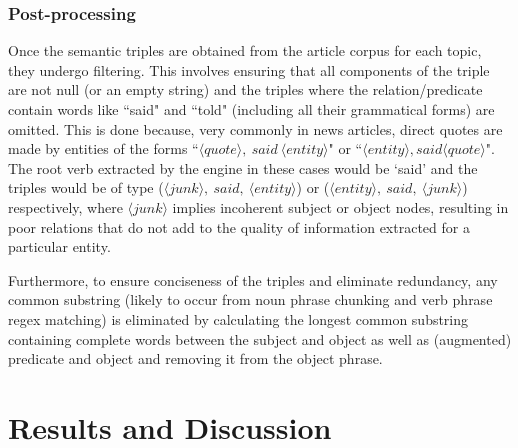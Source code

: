 \subsubsection{Post-processing}
Once the semantic triples are obtained from the article corpus for each topic, they undergo filtering. This involves ensuring that all components of the triple are not null (or an empty string) and the triples where the relation/predicate contain words like ``said" and ``told" (including all their grammatical forms) are omitted. This is done because, very commonly in news articles, direct quotes are made by entities of the forms ``$\langle quote \rangle, \ said \ \langle entity \rangle$" or ``$ \langle entity \rangle, said \big \langle quote \rangle$". The root verb extracted by the engine in these cases would be `said' and the triples would be of type ($\langle junk \rangle, \ said, \ \langle entity \rangle$) or ($\langle entity \rangle, \ said, \ \langle junk \rangle$) respectively, where $\langle junk \rangle$ implies incoherent subject or object nodes, resulting in poor relations that do not add to the quality of information extracted for a particular entity. 

Furthermore, to ensure conciseness of the triples and eliminate redundancy, any common substring (likely to occur from noun phrase chunking and verb phrase regex matching) is eliminated by calculating the longest common substring containing complete words between the subject and object as well as (augmented) predicate and object and removing it from the object phrase. 


\section{Results and Discussion}


